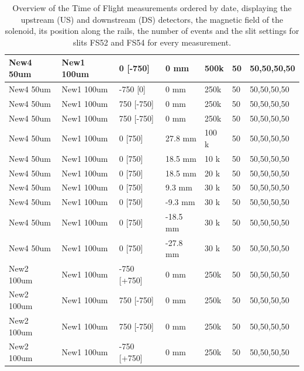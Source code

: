 \begin{refsection}
\begin{table}
\begin{tabular}{|l|l|l|l|l|l|l|}
            New4 50um   & New1 100um  & 0 {[}-750{]}     & 0 mm     & 500k   & 50            & 50,50,50,50       \\ \hline
            New4 50um   & New1 100um  & -750 {[}0{]}     & 0 mm     & 250k   & 50            & 50,50,50,50       \\ \hline
            New4 50um   & New1 100um  & 750 {[}-750{]}   & 0 mm     & 250k   & 50            & 50,50,50,50       \\ \hline
            New4 50um   & New1 100um  & 750 {[}-750{]}   & 0 mm     & 250k   & 50            & 50,50,50,50       \\ \hline
            New4 50um   & New1 100um  & 0 {[}750{]}      & 27.8 mm  & 100 k  & 50            & 50,50,50,50       \\ \hline
            New4 50um   & New1 100um  & 0 {[}750{]}      & 18.5 mm  & 10 k   & 50            & 50,50,50,50       \\ \hline
            New4 50um   & New1 100um  & 0 {[}750{]}      & 18.5 mm  & 20 k   & 50            & 50,50,50,50       \\ \hline
            New4 50um   & New1 100um  & 0 {[}750{]}      & 9.3 mm   & 30 k   & 50            & 50,50,50,50       \\ \hline
            New4 50um   & New1 100um  & 0 {[}750{]}      & -9.3 mm  & 30 k   & 50            & 50,50,50,50       \\ \hline
            New4 50um   & New1 100um  & 0 {[}750{]}      & -18.5 mm & 30 k   & 50            & 50,50,50,50       \\ \hline
            New4 50um   & New1 100um  & 0 {[}750{]}      & -27.8 mm & 30 k   & 50            & 50,50,50,50       \\ \hline
            New2 100um  & New1 100um  & -750 {[}+750{]}  & 0 mm     & 250k   & 50            & 50,50,50,50       \\ \hline
            New2 100um  & New1 100um  & 750 {[}-750{]}   & 0 mm     & 250k   & 50            & 50,50,50,50       \\ \hline
            New2 100um  & New1 100um  & 750 {[}-750{]}   & 0 mm     & 250k   & 50            & 50,50,50,50       \\ \hline
            New2 100um  & New1 100um  & -750 {[}+750{]}  & 0 mm     & 250k   & 50            & 50,50,50,50       \\ \hline
            \end{tabular}
            \caption[Datasets taken in 2023 for the TOF]{Overview of the Time of Flight measurements ordered by date, displaying the upstream (US) and downstream (DS) detectors, the magnetic field of the solenoid, its position along the rails, the number of events and the slit settings for slits FS52 and FS54 for every measurement.}
        \label{tab:ToFMeasurementsOverview}
        \end{table}

\printbibliography[
    heading = bibliographychapter,
    title=Bibliography on Scintillators in muEDM
]

\end{refsection}



